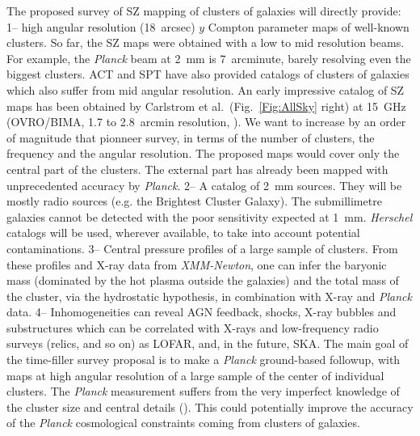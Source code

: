 \documentclass[10pt,a4paper,twoside,graphicx,color]{article}
\begin{document}
\vspace{-0.1cm}  The
proposed survey of SZ mapping of clusters of galaxies will directly
provide: 1-- high angular resolution (18~arcsec) $y$ Compton
parameter maps of well-known clusters. So far, the SZ maps were
obtained with a low to mid resolution beams. For example, the {\sl
  Planck} beam at 2~mm is 7~arcminute, barely resolving even the
biggest clusters. ACT and SPT have also provided catalogs of clusters
of galaxies which also suffer from mid angular resolution. An early
impressive catalog of SZ maps has been obtained by Carlstrom et
al.~(Fig.~\ref{Fig:AllSky} right) at 15~GHz (OVRO/BIMA, 1.7 to
2.8~arcmin resolution, \cite{Reese2002}). We want to increase by an
order of magnitude that pionneer survey, in terms of the number of
clusters, the frequency and the angular resolution. The proposed maps
would cover only the central part of the clusters. The external part
has already been mapped with unprecedented accuracy by {\sl
  Planck}. 2-- A catalog of 2~mm sources. They will be mostly radio
sources (e.g. the Brightest Cluster Galaxy). The submillimetre
galaxies cannot be detected with the poor sensitivity expected at
1~mm. {\sl Herschel} catalogs will be used, wherever available, to
take into account potential contaminations. 3-- Central pressure
profiles of a large sample of clusters. From these profiles and X-ray
data from {\sl XMM-Newton}, one can infer the baryonic mass (dominated
by the hot plasma outside the galaxies) and the total mass of the
cluster, via the hydrostatic hypothesis, in combination with X-ray and
{\sl Planck} data. 4-- Inhomogeneities can reveal AGN feedback,
shocks, X-ray bubbles and substructures which can be correlated with
X-rays and low-frequency radio surveys (relics, and so on) as LOFAR,
and, in the future, SKA. The main goal of the time-filler survey
proposal is to make a {\sl Planck} ground-based followup, with maps at
high angular resolution of a large sample of the center of individual
clusters. The {\sl Planck} measurement suffers from the very imperfect
knowledge of the cluster size and central details
(\cite{Planck2013PressProf}). This could potentially improve the
accuracy of the {\sl Planck} cosmological constraints coming from
clusters of galaxies.
\end{document}
